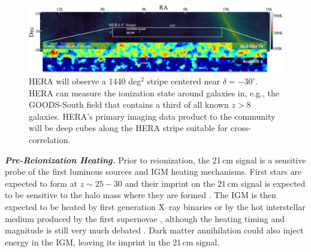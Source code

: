 \documentclass[preprint,11pt]{aastex}
\begin{document}
\begin{figure}[b!]
\centering
\vspace{-15pt}
    \includegraphics[width=1.0\textwidth,clip]{plots/HERA_FoV_w_strips.png}
  \vspace{-20pt}
\caption{\footnotesize 
HERA will observe a 1440 deg$^2$ stripe centered near $\delta = -30^\circ$. HERA can measure the ionization state around galaxies in, e.g., the GOODS-South field that contains a third of all known $z\!>\!8$ galaxies. HERA's primary imaging data product to the community will be deep cubes along the HERA stripe suitable for cross-correlation.
\label{fig:LSS} }
\vspace{-10pt}
\end{figure}

\emph{\textbf{Pre-Reionization Heating.}}
\label{sec:EoX} 
Prior to reionization, the 21\,cm signal is a sensitive probe of the first
luminous sources and IGM heating mechanisms. First stars are expected to form
at $z \sim 25-30$ and their imprint on the 21\,cm signal is expected to be
sensitive to the halo mass where they are formed \citep{mesinger_et_al2015}.
The IGM is then expected to be heated by first
generation X--ray binaries
\citep{furlanetto_et_al2006_global,pritchard_et_al2007,mesinger_et_al2013} or
by the hot interstellar medium produced by the first supernovae
\citep{pacucci_et_al2014}, although the heating timing and magnitude is still
very much debated \citep{fialkov_et_al2012}. Dark matter annihilation
\citep{evoli_et_al2014} could also inject energy in the IGM, leaving its
imprint in the 21\,cm signal.
 
\end{document}

